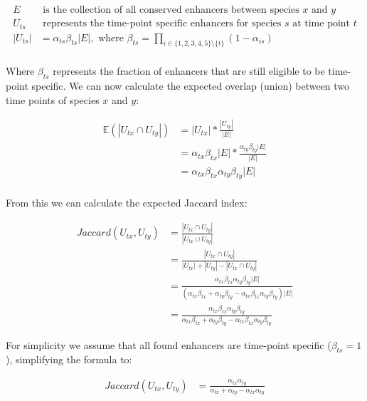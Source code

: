 \begin{align*}
    E & \text{ is the collection of all conserved enhancers between species } x \text{ and } y \\
    U_{ts} & \text{ represents the time-point specific enhancers for species } s \text{ at time point } t \\
    |U_{ts}| & = \alpha_{ts} \beta_{ts} |E|, \text{ where } \beta_{ts} = \prod_{i \in \{1, 2, 3, 4, 5\}\setminus\{t\}} (1 - \alpha_{is}) \\
\end{align*}

Where $\beta_{ts}$ represents the fraction of enhancers that are still eligible to be time-point specific. We can now calculate the expected overlap (union) between two time points of species $x$ and $y$:

\begin{align*}
    \mathbb{E}(|U_{tx} \cap U_{ty}|) & = |U_{tx}| * \frac{|U_{ty}|}{|E|} \\
    & = \alpha_{tx} \beta_{tx} |E| * \frac{\alpha_{ty} \beta_{ty} |E|}{|E|} \\
    & = \alpha_{tx} \beta_{tx} \alpha_{ty} \beta_{ty} |E| \\
\end{align*}

From this we can calculate the expected Jaccard index:

\begin{align*}
    Jaccard(U_{tx}, U_{ty}) & = \frac{|U_{tx} \cap U_{ty}|}{|U_{tx} \cup U_{ty}|} \\
    & = \frac{|U_{tx} \cap U_{ty}|}{|U_{tx}| + |U_{ty}| - |U_{tx} \cap U_{ty}|} \\
    & = \frac{\alpha_{tx} \beta_{tx} \alpha_{ty} \beta_{ty} |E|}{(\alpha_{tx} \beta_{tx} + \alpha_{ty} \beta_{ty} - \alpha_{tx} \beta_{tx} \alpha_{ty} \beta_{ty})|E|} \\
    & = \frac{\alpha_{tx} \beta_{tx} \alpha_{ty} \beta_{ty}}{\alpha_{tx} \beta_{tx} + \alpha_{ty} \beta_{ty} - \alpha_{tx} \beta_{tx} \alpha_{ty} \beta_{ty}}
\end{align*}

For simplicity we assume that all found enhancers are time-point specific ($\beta_{ts} = 1$), simplifying the formula to:

\begin{align*}
    Jaccard(U_{tx}, U_{ty}) & = \frac{\alpha_{tx} \alpha_{ty}}{\alpha_{tx} + \alpha_{ty} - \alpha_{tx} \alpha_{ty}}
\end{align*}

